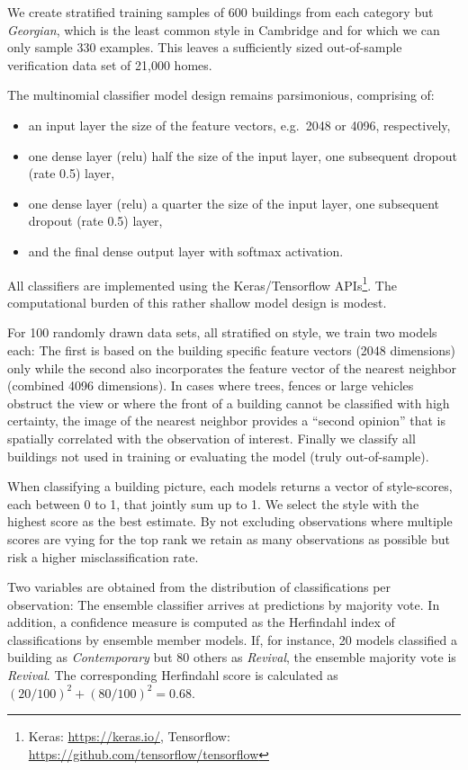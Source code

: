 \documentclass[]{article}
\let\rmarkdownfootnote\footnote%
\def\footnote{\protect\rmarkdownfootnote}
\begin{document}
We create stratified training samples of 600 buildings from each
category but \emph{Georgian}, which is the least common style in
Cambridge and for which we can only sample 330 examples. This leaves a
sufficiently sized out-of-sample verification data set of 21,000 homes.

The multinomial classifier model design remains parsimonious, comprising
of:

\begin{itemize}
\item
  an input layer the size of the feature vectors, e.g.~2048 or 4096,
  respectively,
\item
  one dense layer (relu) half the size of the input layer, one
  subsequent dropout (rate 0.5) layer,
\item
  one dense layer (relu) a quarter the size of the input layer, one
  subsequent dropout (rate 0.5) layer,
\item
  and the final dense output layer with softmax activation.
\end{itemize}

All classifiers are implemented using the Keras/Tensorflow
APIs\footnote{Keras: \href{https://keras.io/}{https://keras.io/}, Tensorflow: \href{https://github.com/tensorflow/tensorflow}{https://github.com/tensorflow/tensorflow}}.
The computational burden of this rather shallow model design is modest.

For 100 randomly drawn data sets, all stratified on style, we train two
models each: The first is based on the building specific feature vectors
(2048 dimensions) only while the second also incorporates the feature
vector of the nearest neighbor (combined 4096 dimensions). In cases
where trees, fences or large vehicles obstruct the view or where the
front of a building cannot be classified with high certainty, the image
of the nearest neighbor provides a ``second opinion'' that is spatially
correlated with the observation of interest. Finally we classify all
buildings not used in training or evaluating the model (truly
out-of-sample).

When classifying a building picture, each models returns a vector of
style-scores, each between 0 to 1, that jointly sum up to 1. We select
the style with the highest score as the best estimate. By not excluding
observations where multiple scores are vying for the top rank we retain
as many observations as possible but risk a higher misclassification
rate.

Two variables are obtained from the distribution of classifications per
observation: The ensemble classifier arrives at predictions by majority
vote. In addition, a confidence measure is computed as the Herfindahl
index of classifications by ensemble member models. If, for instance, 20
models classified a building as \emph{Contemporary} but 80 others as
\emph{Revival}, the ensemble majority vote is \emph{Revival}. The
corresponding Herfindahl score is calculated as
\((20/100)^2 + (80/100)^2 = 0.68\).
\end{document}
